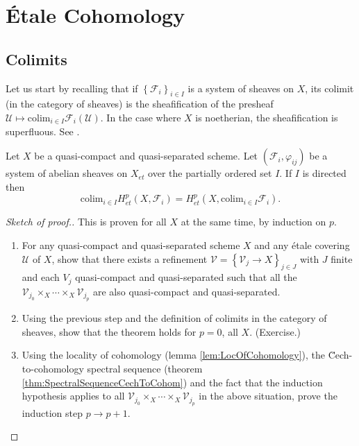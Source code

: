 \section{\'Etale Cohomology}
\subsection{Colimits}

Let us start by recalling that if $\left\{\mathcal{F}_i\right\}_{i\in I}$ is a system of sheaves on $X$, its colimit (in the category of sheaves) is the sheafification of the presheaf $\mathcal{U} \mapsto \text{colim}_{i\in I} \mathcal{F}_i(\mathcal{U})$. In the case where $X$ is noetherian, the sheafification is superfluous. See \cite{Hartshorne}.  

\begin{theorem}
Let $X$ be a quasi-compact and quasi-separated scheme. Let $\left(\mathcal{F}_i, \varphi_{ij}\right)$ be a system of abelian sheaves on $X_{et}$ over the partially ordered set $I$. If $I$ is directed then
$$
\text{colim}_{i\in I} H_{et}^p(X, \mathcal{F}_i) = H_{et}^p(X, \text{colim}_{i\in I} \mathcal{F}_i).
$$
\end{theorem}

\begin{proof}[Sketch of proof.] 
This is proven for all $X$ at the same time, by induction on $p$. 
\begin{enumerate}
\item 
For any quasi-compact and quasi-separated scheme $X$ and any \'etale covering $\mathcal{U}$ of $X$, show that there exists a refinement $\mathcal{V} =\left\{\mathcal{V}_j \to X\right\}_{j\in J}$ with $J$ finite and each $V_j$ quasi-compact and quasi-separated such that all the $\mathcal{V}_{j_0} \times_X \cdots \times_X \mathcal{V}_{j_p}$ are also quasi-compact and quasi-separated. 
\item 
Using the previous step and the definition of colimits in the category of sheaves, show that the theorem holds for $p=0$, all $X$. (Exercise.)
\item 
Using the locality of cohomology (lemma \ref{lem:LocOfCohomology}), the \u Cech-to-cohomology spectral sequence (theorem \ref{thm:SpectralSequenceCechToCohom}) and the fact that the induction hypothesis applies to all $\mathcal{V}_{j_0}\times_X \cdots \times_X \mathcal{V}_{j_p}$ in the above situation, prove the induction step $p\to p+1$. 
\end{enumerate}
\end{proof}

